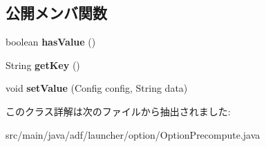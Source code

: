 \subsection*{公開メンバ関数}
\begin{DoxyCompactItemize}
\item 
\hypertarget{classadf_1_1launcher_1_1option_1_1OptionPrecompute_ac5b62385c48c8b96a7b5a9d49b32e3ef}{}\label{classadf_1_1launcher_1_1option_1_1OptionPrecompute_ac5b62385c48c8b96a7b5a9d49b32e3ef} 
boolean {\bfseries has\+Value} ()
\item 
\hypertarget{classadf_1_1launcher_1_1option_1_1OptionPrecompute_ac729fb7a757263da3832e59f7807c9f1}{}\label{classadf_1_1launcher_1_1option_1_1OptionPrecompute_ac729fb7a757263da3832e59f7807c9f1} 
String {\bfseries get\+Key} ()
\item 
\hypertarget{classadf_1_1launcher_1_1option_1_1OptionPrecompute_ad7c65958b80a73307c170d07c2ab1c05}{}\label{classadf_1_1launcher_1_1option_1_1OptionPrecompute_ad7c65958b80a73307c170d07c2ab1c05} 
void {\bfseries set\+Value} (Config config, String data)
\end{DoxyCompactItemize}


このクラス詳解は次のファイルから抽出されました\+:\begin{DoxyCompactItemize}
\item 
src/main/java/adf/launcher/option/Option\+Precompute.\+java\end{DoxyCompactItemize}
